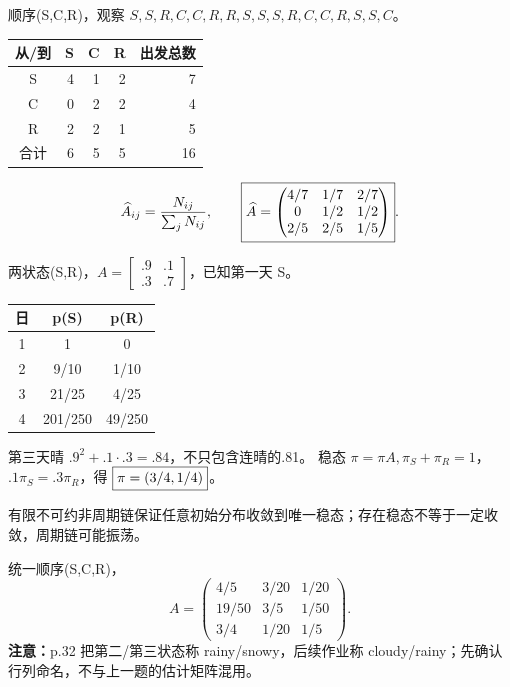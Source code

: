 \label{ex:transition}
顺序(S,C,R)，观察 $S,S,R,C,C,R,R,S,S,S,R,C,C,R,S,S,C$。
\begin{center}\begin{tabular}{c|rrr|r}\toprule
从/到&S&C&R&出发总数\\\midrule
S&4&1&2&7\\C&0&2&2&4\\R&2&2&1&5\\\midrule
合计&6&5&5&16\\\bottomrule\end{tabular}\end{center}
\[
\widehat A_{ij}=\frac{N_{ij}}{\sum_jN_{ij}},\qquad
\boxed{\widehat A=\begin{pmatrix}4/7&1/7&2/7\\0&1/2&1/2\\2/5&2/5&1/5\end{pmatrix}}.
\]

两状态(S,R)，$A=\left[\begin{smallmatrix}.9&.1\\.3&.7\end{smallmatrix}\right]$，已知第一天 S。
\begin{center}\begin{tabular}{c|cc}\toprule
日&p(S)&p(R)\\\midrule
1&1&0\\2&9/10&1/10\\3&21/25&4/25\\4&201/250&49/250\\\bottomrule\end{tabular}\end{center}
第三天晴 $.9^2+.1\cdot.3=.84$，不只包含连晴的.81。
稳态 $\pi=\pi A,\pi_S+\pi_R=1$，$.1\pi_S=.3\pi_R$，得 $\boxed{\pi=(3/4,1/4)}$。

有限不可约非周期链保证任意初始分布收敛到唯一稳态；存在稳态不等于一定收敛，周期链可能振荡。

统一顺序(S,C,R)，
\[
A=\begin{pmatrix}4/5&3/20&1/20\\19/50&3/5&1/50\\3/4&1/20&1/5\end{pmatrix}.
\]
\textbf{注意：}p.32 把第二/第三状态称 rainy/snowy，后续作业称 cloudy/rainy；先确认行列命名，不与上一题的估计矩阵混用。

